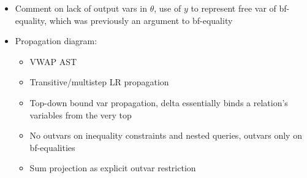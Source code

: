 \begin{itemize}
\item Comment on lack of output vars in $\theta$, use of $y$ to
represent free var of bf-equality, which was previously an argument to
bf-equality

\item Propagation diagram:
    \begin{itemize}
      \item VWAP AST
      \item Transitive/multistep LR propagation
      \item Top-down bound var propagation, delta essentially binds a relation's
      variables from the very top
      \item No outvars on inequality constraints and nested queries, outvars only
      on bf-equalities
      \item Sum projection as explicit outvar restriction
    \end{itemize}

\end{itemize}

\noindent{}

